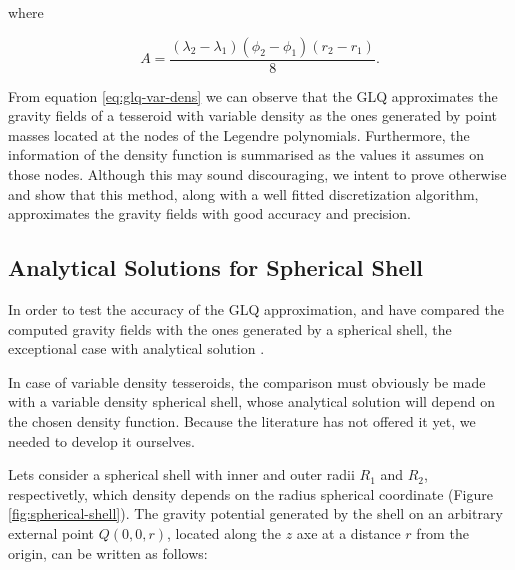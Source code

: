 \documentclass[extra]{gji}
\begin{document}
\noindent where

\begin{equation}
    A = 
    \frac{(\lambda_2 - \lambda_1)(\phi_2 - \phi_1)(r_2 - r_1)}{8}.
\end{equation}

From equation \ref{eq:glq-var-dens} we can observe that the GLQ approximates the gravity fields of a tesseroid with variable density as the ones generated by point masses located at the nodes of the Legendre polynomials.
Furthermore, the information of the density function is summarised as the values it assumes on those nodes.
Although this may sound discouraging, we intent to prove otherwise and show that this method, along with a well fitted discretization algorithm, approximates the gravity fields with good accuracy and precision.


\subsection{Analytical Solutions for Spherical Shell}

In order to test the accuracy of the GLQ approximation, \citet{Uieda2016} and \citet{Grombein2013} have compared the computed gravity fields with the ones generated by a spherical shell, the exceptional case with analytical solution \citep{Mikuska2006,Grombein2013}.

In case of variable density tesseroids, the comparison must obviously be made with a variable density spherical shell, whose analytical solution will depend on the chosen density function.
Because the literature has not offered it yet, we needed to develop it ourselves.

Lets consider a spherical shell with inner and outer radii $R_1$ and $R_2$, respectivetly, which density depends on the radius spherical coordinate (Figure \ref{fig:spherical-shell}).
The gravity potential generated by the shell on an arbitrary external point $Q(0,0,r)$, located along the $z$ axe at a distance $r$ from the origin, can be written as follows:
\end{document}
